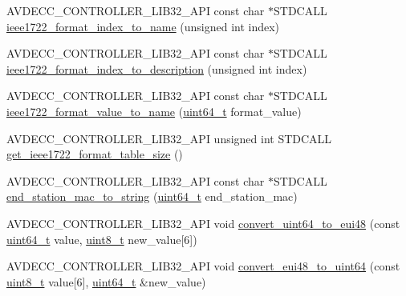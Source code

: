 \begin{DoxyCompactItemize}
A\+V\+D\+E\+C\+C\+\_\+\+C\+O\+N\+T\+R\+O\+L\+L\+E\+R\+\_\+\+L\+I\+B32\+\_\+\+A\+PI const char $\ast$S\+T\+D\+C\+A\+LL \hyperlink{namespaceavdecc__lib_1_1utility_a7efc04e32740827572448cf792bd202e}{ieee1722\+\_\+format\+\_\+index\+\_\+to\+\_\+name} (unsigned int index)
\item 
A\+V\+D\+E\+C\+C\+\_\+\+C\+O\+N\+T\+R\+O\+L\+L\+E\+R\+\_\+\+L\+I\+B32\+\_\+\+A\+PI const char $\ast$S\+T\+D\+C\+A\+LL \hyperlink{namespaceavdecc__lib_1_1utility_a0cbd29bdcbdc92a1550bf2813c684c94}{ieee1722\+\_\+format\+\_\+index\+\_\+to\+\_\+description} (unsigned int index)
\item 
A\+V\+D\+E\+C\+C\+\_\+\+C\+O\+N\+T\+R\+O\+L\+L\+E\+R\+\_\+\+L\+I\+B32\+\_\+\+A\+PI const char $\ast$S\+T\+D\+C\+A\+LL \hyperlink{namespaceavdecc__lib_1_1utility_a65f055a50d3d236b67d30c1a7b8425c8}{ieee1722\+\_\+format\+\_\+value\+\_\+to\+\_\+name} (\hyperlink{parse_8c_aec6fcb673ff035718c238c8c9d544c47}{uint64\+\_\+t} format\+\_\+value)
\item 
A\+V\+D\+E\+C\+C\+\_\+\+C\+O\+N\+T\+R\+O\+L\+L\+E\+R\+\_\+\+L\+I\+B32\+\_\+\+A\+PI unsigned int S\+T\+D\+C\+A\+LL \hyperlink{namespaceavdecc__lib_1_1utility_a07c1846bdf7c8e7d7455fa64426ae0ab}{get\+\_\+ieee1722\+\_\+format\+\_\+table\+\_\+size} ()
\item 
A\+V\+D\+E\+C\+C\+\_\+\+C\+O\+N\+T\+R\+O\+L\+L\+E\+R\+\_\+\+L\+I\+B32\+\_\+\+A\+PI const char $\ast$S\+T\+D\+C\+A\+LL \hyperlink{namespaceavdecc__lib_1_1utility_a5a8f858065c29351840fac0842d82450}{end\+\_\+station\+\_\+mac\+\_\+to\+\_\+string} (\hyperlink{parse_8c_aec6fcb673ff035718c238c8c9d544c47}{uint64\+\_\+t} end\+\_\+station\+\_\+mac)
\item 
A\+V\+D\+E\+C\+C\+\_\+\+C\+O\+N\+T\+R\+O\+L\+L\+E\+R\+\_\+\+L\+I\+B32\+\_\+\+A\+PI void \hyperlink{namespaceavdecc__lib_1_1utility_a723fa51b0a25cbec764d4e7fa1f5daac}{convert\+\_\+uint64\+\_\+to\+\_\+eui48} (const \hyperlink{parse_8c_aec6fcb673ff035718c238c8c9d544c47}{uint64\+\_\+t} value, \hyperlink{stdint_8h_aba7bc1797add20fe3efdf37ced1182c5}{uint8\+\_\+t} new\+\_\+value\mbox{[}6\mbox{]})
\item 
A\+V\+D\+E\+C\+C\+\_\+\+C\+O\+N\+T\+R\+O\+L\+L\+E\+R\+\_\+\+L\+I\+B32\+\_\+\+A\+PI void \hyperlink{namespaceavdecc__lib_1_1utility_a93805682670fa173878eaecac28efc2c}{convert\+\_\+eui48\+\_\+to\+\_\+uint64} (const \hyperlink{stdint_8h_aba7bc1797add20fe3efdf37ced1182c5}{uint8\+\_\+t} value\mbox{[}6\mbox{]}, \hyperlink{parse_8c_aec6fcb673ff035718c238c8c9d544c47}{uint64\+\_\+t} \&new\+\_\+value)
\end{DoxyCompactItemize}
